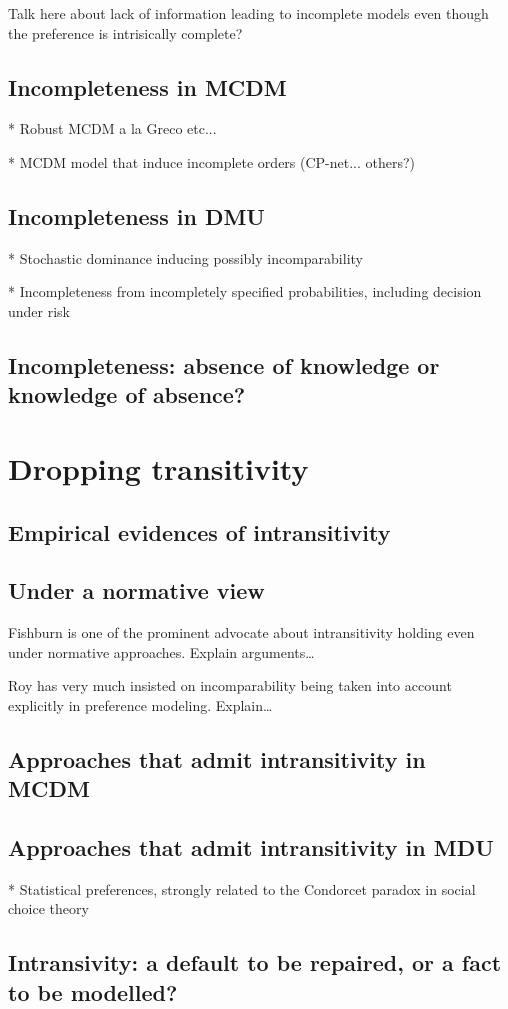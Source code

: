 \documentclass[french, english]{llncs}
\begin{document}
Talk here about lack of information leading to incomplete models even though the preference is intrisically complete?

\subsection{Incompleteness in MCDM}

* Robust MCDM a la Greco etc...

* MCDM model that induce incomplete orders (CP-net... others?)

\subsection{Incompleteness in DMU}

* Stochastic dominance inducing possibly incomparability

* Incompleteness from incompletely specified probabilities, including decision under risk

\subsection{Incompleteness: absence of knowledge or knowledge of absence?}

\section{Dropping transitivity}

\subsection{Empirical evidences of intransitivity}

\subsection{Under a normative view}
Fishburn is one of the prominent advocate about intransitivity holding even under normative approaches. Explain arguments…

Roy has very much insisted on incomparability being taken into account explicitly in preference modeling. Explain…

\subsection{Approaches that admit intransitivity in MCDM}

\subsection{Approaches that admit intransitivity in MDU}

* Statistical preferences, strongly related to the Condorcet paradox in social choice theory

\subsection{Intransivity: a default to be repaired, or a fact to be modelled?}
\end{document}
